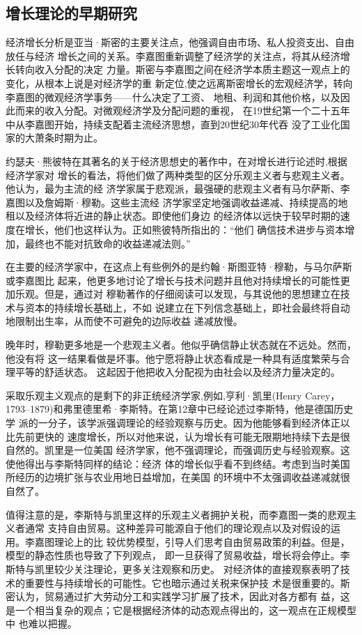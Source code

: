 \subsection{增长理论的早期研究}

经济增长分析是亚当·斯密的主要关注点，他强调自由市场、私人投资支出、自由放任与经济
增长之间的关系。李嘉图重新调整了经济学的关注点，将其从经济增长转向收入分配的决定
力量。斯密与李嘉图之间在经济学本质主题这一观点上的变化，从根本上说是对经济学的重
新定位,使之远离斯密增长的宏观经济学，转向李嘉图的微观经济学事务——什么决定了工资、
地租、利润和其他价格，以及因此而来的收入分配。对微观经济学及分配问题的重视，
在19世纪第一个二十五年中从李嘉图开始，持续支配着主流经济思想，直到20世纪30年代吞
没了工业化国家的大萧条时期为止。

约瑟夫·熊彼特在其著名的关于经济思想史的著作中，在对增长进行论述时,根据经济学家对
增长的看法，将他们做了两种类型的区分乐观主义者与悲观主义者。他认为，最为主流的经
济学家属于悲观派，最强硬的悲观主义者有马尔萨斯、李嘉图以及詹姆斯·穆勒。这些主流经
济学家坚定地强调收益递减、持续提高的地租以及经济体将近进的静止状态。即使他们身边
的经济体以远快于较早时期的速度在增长，他们也这样认为。正如熊彼特所指出的：“他们
确信技术进步与资本增加，最终也不能对抗致命的收益递减法则。”

在主要的经济学家中，在这点上有些例外的是约翰·斯图亚特·穆勒，与马尔萨斯或李嘉图比
起来，他更多地讨论了增长与技术问题并且他对持续增长的可能性更加乐观。但是，通过对
穆勒著作的仔细阅读可以发现，与其说他的思想建立在技术与资本的持续增长基础上，不如
说建立在下列信念基础上，即社会最终将自动地限制出生率，从而使不可避免的边际收益
递减放慢。

晚年时，穆勒更多地是一个悲观主义者。他似乎确信静止状态就在不远处。然而，他没有将
这一结果看做是坏事。他宁愿将静止状态看成是一种具有适度繁荣与合理平等的舒适状态。
这起因于他把收入分配视为由社会以及经济力量决定的。

采取乐观主义观点的是剩下的非正统经济学家,例如,亨利·凯里(Henry
Carey，1793--1879)和弗里德里希·李斯特。在第12章中已经论述过李斯特，他是德国历史学
派的一分子，该学派强调理论的经验观察与历史。因为他能够看到经济体正以比先前更快的
速度增长，所以对他来说，认为增长有可能无限期地持续下去是很自然的。凯里是一位美国
经济学家，他不强调理论，而强调历史与经验观察。这使他得出与李斯特同样的结论：经济
体的增长似乎看不到终结。考虑到当时美国所经历的边境扩张与农业用地日益增加，在美国
的环境中不太强调收益递减就很自然了。

值得注意的是，李斯特与凯里这样的乐观主义者拥护关税，而李嘉图一类的悲观主义者通常
支持自由贸易。这种差异可能源自于他们的理论观点以及对假设的运用。李嘉图理论上的比
较优势模型，引导人们思考自由贸易政策的利益。但是，模型的静态性质也导致了下列观点，
即一旦获得了贸易收益，增长将会停止。李斯特与凯里较少关注理论，更多关注观察和历史。
对经济体的直接观察表明了技术的重要性与持续增长的可能性。它也暗示通过关税来保护技
术是很重要的。斯密认为，贸易通过扩大劳动分工和实践学习扩展了技术，因此对各方都有
益，这是一个相当复杂的观点；它是根据经济体的动态观点得出的，这一观点在正规模型中
也难以把握。

